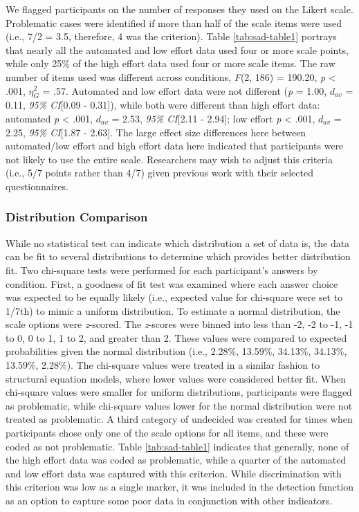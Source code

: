 \documentclass[english,man]{apa6}
\theoremstyle{definition}
\theoremstyle{definition}
\theoremstyle{definition}
\theoremstyle{remark}
\begin{document}
We flagged participants on the number of responses they used on the
Likert scale. Problematic cases were identified if more than half of the
scale items were used (i.e., 7/2 = 3.5, therefore, 4 was the criterion).
Table \ref{tab:sad-table1} portrays that nearly all the automated and
low effort data used four or more scale points, while only 25\% of the
high effort data used four or more scale items. The raw number of items
used was different across conditions, \emph{F}(2, 186) = 190.20,
\emph{p} \textless{} .001, \(\eta_G^2\) = .57. Automated and low effort
data were not different (\emph{p} = 1.00, \(d_{av}\) = 0.11, \emph{95\%
CI}{[}0.09 - 0.31{]}), while both were different than high effort data:
automated \emph{p} \textless{} .001, \(d_{av}\) = 2.53, \emph{95\%
CI}{[}2.11 - 2.94{]}; low effort \emph{p} \textless{} .001, \(d_{av}\) =
2.25, \emph{95\% CI}{[}1.87 - 2.63{]}. The large effect size differences
here between automated/low effort and high effort data here indicated
that participants were not likely to use the entire scale. Researchers
may wish to adjust this criteria (i.e., 5/7 points rather than 4/7)
given previous work with their selected questionnaires.

\subsubsection{Distribution Comparison}\label{distribution-comparison}

While no statistical test can indicate which distribution a set of data
is, the data can be fit to several distributions to determine which
provides better distribution fit. Two chi-square tests were performed
for each participant's answers by condition. First, a goodness of fit
test was examined where each answer choice was expected to be equally
likely (i.e., expected value for chi-square were set to 1/7th) to mimic
a uniform distribution. To estimate a normal distribution, the scale
options were \emph{z}-scored. The \emph{z}-scores were binned into less
than -2, -2 to -1, -1 to 0, 0 to 1, 1 to 2, and greater than 2. These
values were compared to expected probabilities given the normal
distribution (i.e., 2.28\%, 13.59\%, 34.13\%, 34.13\%, 13.59\%, 2.28\%).
The chi-square values were treated in a similar fashion to structural
equation models, where lower values were considered better fit. When
chi-square values were smaller for uniform distributions, participants
were flagged as problematic, while chi-square values lower for the
normal distribution were not treated as problematic. A third category of
undecided was created for times when participants chose only one of the
scale options for all items, and these were coded as not problematic.
Table \ref{tab:sad-table1} indicates that generally, none of the high
effort data was coded as problematic, while a quarter of the automated
and low effort data was captured with this criterion. While
discrimination with this criterion was low as a single marker, it was
included in the detection function as an option to capture some poor
data in conjunction with other indicators.
\end{document}
